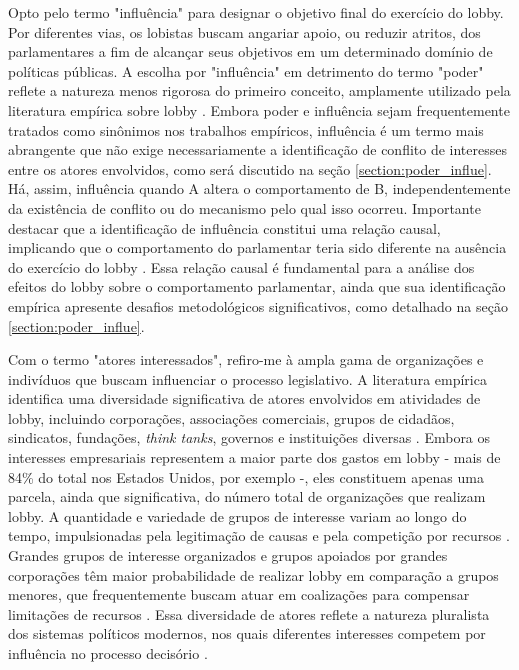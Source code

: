 Opto pelo termo "influência" para designar o objetivo final do exercício do lobby. Por diferentes vias, os lobistas buscam angariar apoio, ou reduzir atritos, dos parlamentares a fim de alcançar seus objetivos em um determinado domínio de políticas públicas. A escolha por "influência" em detrimento do termo "poder" reflete a natureza menos rigorosa do primeiro conceito, amplamente utilizado pela literatura empírica sobre lobby \cite{lowery_lobbying_2013}. Embora poder e influência sejam frequentemente tratados como sinônimos nos trabalhos empíricos, influência é um termo mais abrangente que não exige necessariamente a identificação de conflito de interesses entre os atores envolvidos, como será discutido na seção \ref{section:poder_influe}. Há, assim, influência quando A altera o comportamento de B, independentemente da existência de conflito ou do mecanismo pelo qual isso ocorreu. Importante destacar que a identificação de influência constitui uma relação causal, implicando que o comportamento do parlamentar teria sido diferente na ausência do exercício do lobby \cite{lowery_lobbying_2013}. Essa relação causal é fundamental para a análise dos efeitos do lobby sobre o comportamento parlamentar, ainda que sua identificação empírica apresente desafios metodológicos significativos, como detalhado na seção \ref{section:poder_influe}.

Com o termo "atores interessados", refiro-me à ampla gama de organizações e indivíduos que buscam influenciar o processo legislativo. A literatura empírica identifica uma diversidade significativa de atores envolvidos em atividades de lobby, incluindo corporações, associações comerciais, grupos de cidadãos, sindicatos, fundações, \textit{think tanks}, governos e instituições diversas \cite{baumgartner2009lobbying, de_figueiredo_advancing_2014}. Embora os interesses empresariais representem a maior parte dos gastos em lobby - mais de 84\% do total nos Estados Unidos, por exemplo \cite{de_figueiredo_advancing_2014} -, eles constituem apenas uma parcela, ainda que significativa, do número total de organizações que realizam lobby. A quantidade e variedade de grupos de interesse variam ao longo do tempo, impulsionadas pela legitimação de causas e pela competição por recursos \cite{lowery2007organized}. Grandes grupos de interesse organizados e grupos apoiados por grandes corporações têm maior probabilidade de realizar lobby em comparação a grupos menores, que frequentemente buscam atuar em coalizações para compensar limitações de recursos \cite{de_figueiredo_advancing_2014, richter2011good}. Essa diversidade de atores reflete a natureza pluralista dos sistemas políticos modernos, nos quais diferentes interesses competem por influência no processo decisório \cite{schmitter1974still}.

